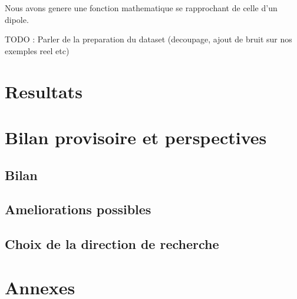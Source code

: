 \documentclass[a4paper, 12pt, titlepage, oneside]{article}
\begin{document}
	Nous avons genere une fonction mathematique se rapprochant de celle d'un dipole. 

	TODO : Parler de la preparation du dataset (decoupage, ajout de bruit sur nos exemples reel etc)
\newpage
\section{Resultats}

\newpage
\section{Bilan provisoire et perspectives}
	\subsection{Bilan} %
	\subsection{Ameliorations possibles}
	\subsection{Choix de la direction de recherche}

\newpage
\section{Annexes}
\end{document}
